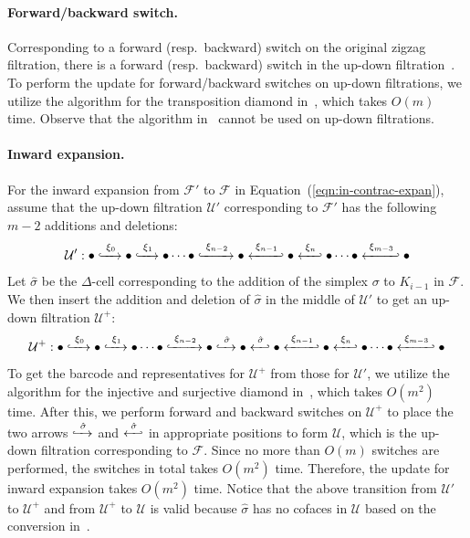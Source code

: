 \documentclass[letterpaper,11pt]{article}
\theoremstyle{mythmstyle}
\theoremstyle{mydefstyle}
\theoremstyle{plain}
\theoremstyle{definition}
\newcommand{\<}[1]{\langle #1\rangle}
\newcommand{\lbarrowspace}{\;}
\newcommand{\inctosp}[1]{\xhookrightarrow{\lbarrowspace#1\lbarrowspace}}
\newcommand{\bakinctosp}[1]{\xhookleftarrow{\lbarrowspace#1\lbarrowspace}}
\newcommand{\Fcal}{\mathcal{F}}
\newcommand{\Ucal}{\mathcal{U}}
\newcommand{\DG}{\Delta}
\newcommand{\sG}{\sigma}
\newcommand{\filtcnt}{m}
\newcommand{\simpcnt}{n}
\newcommand{\usimp}{{\xi}}
\begin{document}
\paragraph{Forward/backward switch.}
Corresponding to a forward (resp.\ backward) switch on the original zigzag filtration,
there is a forward (resp.\ backward) switch 
in the up-down filtration~\cite{dey2023revisiting}.
To perform the update for forward/backward switches
on up-down filtrations,
we utilize the algorithm for the {transposition diamond}
in~\cite{maria2014zigzag},
which takes $O(\filtcnt)$ time.
Observe that the algorithm 
in~\cite{cohen2006vines}
cannot be used on up-down filtrations.


\paragraph{Inward expansion.}
For the inward expansion from $\Fcal'$ to $\Fcal$ in Equation~(\ref{eqn:in-contrac-expan}),
assume that the up-down filtration $\Ucal'$ corresponding to $\Fcal'$
has the following 
$\filtcnt-2$ additions and deletions:
\begin{equation*}
\Ucal':
\bullet
\inctosp{\usimp_0}
\bullet
\inctosp{\usimp_{1}}
\bullet
\cdots
\bullet\inctosp{\usimp_{\simpcnt-2}} 
\bullet
\bakinctosp{\usimp_{\simpcnt-1}}
\bullet
\bakinctosp{\usimp_{\simpcnt}}
\bullet
\cdots
\bullet
\bakinctosp{\usimp_{\filtcnt-3}}
\bullet
\end{equation*}
Let $\hat{\sG}$ be the $\DG$-cell corresponding to 
the addition of the simplex $\sG$ to $K_{i-1}$ in $\Fcal$.
We then insert the addition and deletion of $\hat{\sG}$
in the middle of $\Ucal'$ to get
an up-down filtration
$\Ucal^+$:
\begin{equation}
\label{eqn:U-plus}
\Ucal^+:
\bullet
\inctosp{\usimp_0}
\bullet
\inctosp{\usimp_{1}}
\bullet
\cdots
\bullet\inctosp{\usimp_{\simpcnt-2}} 
\bullet
\inctosp{\hat{\sG}} 
\bullet
\bakinctosp{\hat{\sG}}
\bullet
\bakinctosp{\usimp_{\simpcnt-1}}
\bullet
\bakinctosp{\usimp_{\simpcnt}}
\bullet
\cdots
\bullet
\bakinctosp{\usimp_{\filtcnt-3}}
\bullet
\end{equation}
To get 
the barcode and representatives for $\Ucal^+$
from those for $\Ucal'$, 
we utilize the algorithm
for the {injective} and {surjective diamond}
in~\cite{maria2014zigzag},
which takes $O(\filtcnt^2)$ time.
After this, we perform forward and backward switches on $\Ucal^+$ to 
place the two arrows $\inctosp{\hat{\sG}}$ and $\bakinctosp{\hat{\sG}}$
in  appropriate positions to form $\Ucal$,
which is the up-down filtration corresponding to $\Fcal$.
Since no more than $O(\filtcnt)$ switches are performed,
the switches in total
takes $O(\filtcnt^2)$ time.
Therefore, the update for inward expansion takes $O(\filtcnt^2)$ time.
Notice that the above transition from $\Ucal'$ to $\Ucal^+$
and from $\Ucal^+$ to $\Ucal$ is valid because $\hat{\sG}$ has no cofaces
in $\Ucal$ based on the conversion in~\cite{dey2022fast}.
\end{document}
